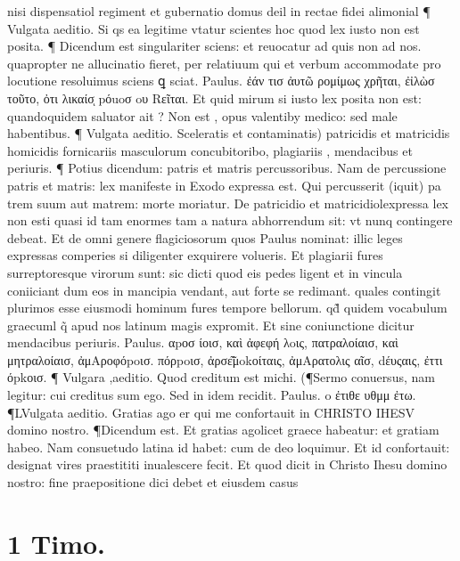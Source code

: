 \documentclass{article}
\begin{document}
\begin{pages}
nisi dispensatiol regiment et gubernatio domus deil in rectae fidei alimonial ¶ Vulgata aeditio. Si qs ea legitime vtatur scientes hoc quod lex iusto non est posita. ¶ Dicendum est singulariter sciens: et reuocatur ad quis non ad nos. quapropter ne allucinatio fieret, per relatiuum qui et verbum accommodate pro locutione resoluimus sciens ꝗ sciat. Paulus. ἐάν τισ ἀυτῶ ρομίμως χρῆται, ἐἰλὼσ τοῦτο, ὀτι λικαίσͅ pόuoσ oυ Rεῖται. Et quid mirum si iusto lex posita non est: quandoquidem saluator ait ? Non est , opus valentiby medico: sed male habentibus. ¶ Vulgata aeditio. Sceleratis et contaminatis) patricidis et matricidis homicidis fornicariis masculorum concubitoribo, plagiariis  , mendacibus et periuris. ¶ Potius dicendum: patris et matris percussoribus. Nam de percussione patris et matris: lex manifeste in Exodo expressa est. Qui percusserit (iquit) pa trem suum aut matrem: morte moriatur. De patricidio et matricidiolexpressa lex non esti quasi id tam enormes tam a natura abhorrendum sit: vt nunq contingere debeat. Et de omni genere flagiciosorum quos Paulus nominat: illic leges expressas comperies si diligenter exquirere volueris. Et plagiarii fures surreptoresque virorum sunt: sic dicti quod eis pedes ligent et in vincula coniiciant dum eos in mancipia vendant, aut forte se redimant. quales contingit plurimos esse eiusmodi hominum fures tempore bellorum. qd̃ quidem vocabulum graecuml q̃ apud nos latinum magis expromit. Et sine coniunctione dicitur mendacibus periuris. Paulus. αpοσ ίοισ, καὶ ἀφεφή λoις, πατραλοίαισ, καὶ μητραλοίαισ, ἀμAροφόpoισ. πόρpoισ, ἀρσε̃͂μokοίταις, ἀμAρατολις αῖσ, dέυςαις, ἐττι όpkοισ. ¶ Vulgara ,aeditio. Quod creditum est michi. (¶Sermo conuersus, nam legitur: cui creditus sum ego. Sed in idem recidit. Paulus. o ἐτιθε υθμμ ἐτω. ¶LVulgata aeditio. Gratias ago er qui me confortauit in CHRISTO IHESV domino nostro. ¶Dicendum est. Et gratias agolicet graece habeatur: et gratiam habeo. Nam consuetudo latina id habet: cum de deo loquimur. Et id confortauit: designat vires praestititi inualescere fecit. Et quod dicit in Christo Ihesu domino nostro: fine praepositione dici debet et eiusdem casus  \pend
\section*{1 Timo. }

\end{pages}
\end{document}
